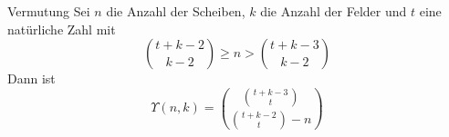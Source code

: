 \begin{frame}{Vermutung}
    Sei $n$ die Anzahl der Scheiben, $k$ die Anzahl der Felder und $t$ eine natürliche Zahl mit
    \[\binom{t+k-2}{k-2}\geq n>\binom{t+k-3}{k-2}\]
    Dann ist \[\Upsilon(n,k) = \binom{\binom{t+k-3}{t}}{\binom{t+k-2}{t}-n}\]
\end{frame}